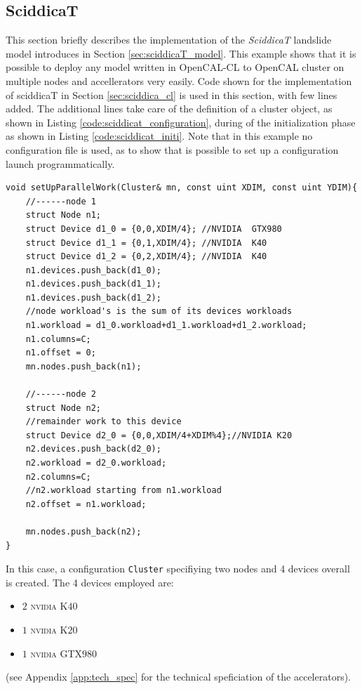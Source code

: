 \subsection{SciddicaT}
This section briefly describes the implementation of the \textit{SciddicaT} landslide model introduces in Section \ref{sec:sciddicaT_model}.
This example shows that it is possible to deploy any model written in OpenCAL-CL to OpenCAL cluster on multiple nodes and accellerators very easily. 
Code shown for the implementation of sciddicaT  in Section \ref{sec:sciddica_cl} is used in this section, with few lines added.
The additional lines take care of the definition of a cluster object, as shown in Listing \ref{code:sciddicat_configuration}, during of the initialization phase as shown in Listing \ref{code:sciddicat_initi}.
Note that in this example no configuration file is used, as to show that is possible to set up a configuration launch programmatically.

\begin{lstlisting}
void setUpParallelWork(Cluster& mn, const uint XDIM, const uint YDIM){
	//------node 1
	struct Node n1;
	struct Device d1_0 = {0,0,XDIM/4}; //NVIDIA  GTX980
	struct Device d1_1 = {0,1,XDIM/4}; //NVIDIA  K40
	struct Device d1_2 = {0,2,XDIM/4}; //NVIDIA  K40	
	n1.devices.push_back(d1_0);
	n1.devices.push_back(d1_1);
	n1.devices.push_back(d1_2);
	//node workload's is the sum of its devices workloads
	n1.workload = d1_0.workload+d1_1.workload+d1_2.workload;
	n1.columns=C;
	n1.offset = 0;
	mn.nodes.push_back(n1);
	
	//------node 2
	struct Node n2;
	//remainder work to this device
	struct Device d2_0 = {0,0,XDIM/4+XDIM%4};//NVIDIA K20
	n2.devices.push_back(d2_0);
	n2.workload = d2_0.workload;
	n2.columns=C;
	//n2.workload starting from n1.workload
	n2.offset = n1.workload;
	
	mn.nodes.push_back(n2);
}
\end{lstlisting}
In this case, a configuration \texttt{Cluster} specifiying two nodes and 4 devices overall is created. The 4 devices employed are: 
\begin{itemize}
	\item $2$ \textsc{nvidia} K$40$
	\item $1$ \textsc{nvidia} K$20$
	\item $1$ \textsc{nvidia} GTX$980$
\end{itemize}
(see Appendix \ref{app:tech_spec} for the technical speficiation of the accelerators).

